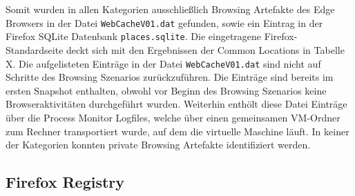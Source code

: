 \begin{appendices}
Somit wurden in allen Kategorien ausschließlich Browsing Artefakte des Edge Browsers in der Datei \texttt{WebCacheV01.dat} gefunden, sowie ein Eintrag in der Firefox SQLite Datenbank \texttt{places.sqlite}. Die eingetragene Firefox-Standardseite deckt sich mit den Ergebnissen der Common Locations in Tabelle X. Die aufgelisteten Einträge in der Datei \texttt{WebCacheV01.dat} sind nicht auf Schritte des Browsing Szenarios zurückzuführen. Die Einträge sind bereits im ersten Snapshot enthalten, obwohl vor Beginn des Browsing Szenarios keine Browseraktivitäten durchgeführt wurden. Weiterhin enthölt diese Datei Einträge über die Process Monitor Logfiles, welche über einen gemeinsamen VM-Ordner zum Rechner transportiert wurde, auf dem die virtuelle Maschine läuft.
In keiner der Kategorien konnten private Browsing Artefakte identifiziert werden.


\subsection*{Firefox Registry}


\end{appendices}
